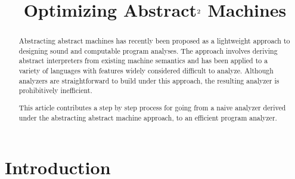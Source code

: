 \documentclass[preprint,onecolumn,9pt]{sigplanconf} %
\begin{document}
\copyrightdata{[to be supplied]} 


\title{Optimizing Abstract$^{\text 2}$ Machines}

\authorinfo{}{}{}

\maketitle

\begin{abstract}
Abstracting abstract machines has recently been proposed as a
lightweight approach to designing sound and computable program
analyses.  The approach involves deriving abstract interpreters from
existing machine semantics and has been applied to a variety of
languages with features widely considered difficult to analyze.
Although analyzers are straightforward to build under this approach,
the resulting analyzer is prohibitively inefficient.

This article contributes a step by step process for going from a naive
analyzer derived under the abstracting abstract machine approach, to
an efficient program analyzer.
\end{abstract}




\section{Introduction}
\end{document}
